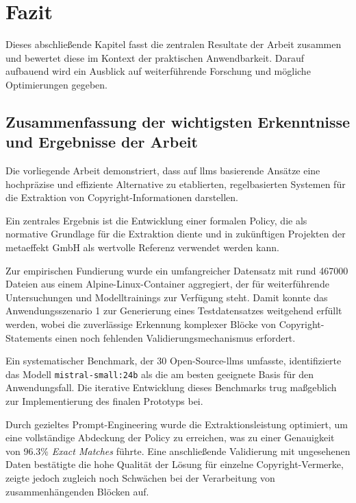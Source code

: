 \chapter{Fazit}\label{ch:fazit}

Dieses abschließende Kapitel fasst die zentralen Resultate der Arbeit zusammen und bewertet diese im Kontext der praktischen Anwendbarkeit.
Darauf aufbauend wird ein Ausblick auf weiterführende Forschung und mögliche Optimierungen gegeben.


\section{Zusammenfassung der wichtigsten Erkenntnisse und Ergebnisse der Arbeit}

Die vorliegende Arbeit demonstriert, dass auf \glspl{llm} basierende Ansätze eine hochpräzise und effiziente Alternative zu etablierten, regelbasierten Systemen für die Extraktion von Copyright-Informationen darstellen.

Ein zentrales Ergebnis ist die Entwicklung einer formalen Policy, die als normative Grundlage für die Extraktion diente und in zukünftigen Projekten der metaeffekt GmbH als wertvolle Referenz verwendet werden kann.

Zur empirischen Fundierung wurde ein umfangreicher Datensatz mit rund \num{467000} Dateien aus einem Alpine-Linux-Container aggregiert, der für weiterführende Untersuchungen und Modelltrainings zur Verfügung steht.
Damit konnte das Anwendungsszenario 1 zur Generierung eines Testdatensatzes weitgehend erfüllt werden, wobei die zuverlässige Erkennung komplexer Blöcke von Copyright-Statements einen noch fehlenden Validierungsmechanismus erfordert.

Ein systematischer Benchmark, der 30 Open-Source-\glspl{llm} umfasste, identifizierte das Modell \texttt{mistral-small:24b} als die am besten geeignete Basis für den Anwendungsfall.
Die iterative Entwicklung dieses Benchmarks trug maßgeblich zur Implementierung des finalen Prototyps bei.

Durch gezieltes Prompt-Engineering wurde die Extraktionsleistung optimiert, um eine vollständige Abdeckung der Policy zu erreichen, was zu einer Genauigkeit von \num{96,3}\% \textit{Exact Matches} führte.
Eine anschließende Validierung mit ungesehenen Daten bestätigte die hohe Qualität der Lösung für einzelne Copyright-Vermerke, zeigte jedoch zugleich noch Schwächen bei der Verarbeitung von zusammenhängenden Blöcken auf.

